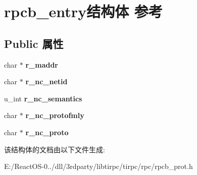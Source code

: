 \hypertarget{structrpcb__entry}{}\section{rpcb\+\_\+entry结构体 参考}
\label{structrpcb__entry}
\subsection*{Public 属性}
\begin{DoxyCompactItemize}
\item 
\mbox{\label{structrpcb__entry_a866ce5bb3713d3a335ad279e9980bd8f}} 
char $\ast$ {\bfseries r\+\_\+maddr}
\item 
\mbox{\label{structrpcb__entry_a77b0fdc3eacbeb3711e61cfd9965bfae}} 
char $\ast$ {\bfseries r\+\_\+nc\+\_\+netid}
\item 
\mbox{\label{structrpcb__entry_a139d02b7d15bdb268961b485fd480c89}} 
u\+\_\+int {\bfseries r\+\_\+nc\+\_\+semantics}
\item 
\mbox{\label{structrpcb__entry_a31e49daa1a25bec23dc9ea0164403771}} 
char $\ast$ {\bfseries r\+\_\+nc\+\_\+protofmly}
\item 
\mbox{\label{structrpcb__entry_a07f415433b5fad36ca5e667d922335b9}} 
char $\ast$ {\bfseries r\+\_\+nc\+\_\+proto}
\end{DoxyCompactItemize}


该结构体的文档由以下文件生成\+:\begin{DoxyCompactItemize}
\item 
E\+:/\+React\+O\+S-\/0../dll/3rdparty/libtirpc/tirpc/rpc/rpcb\+\_\+prot.\+h\end{DoxyCompactItemize}
